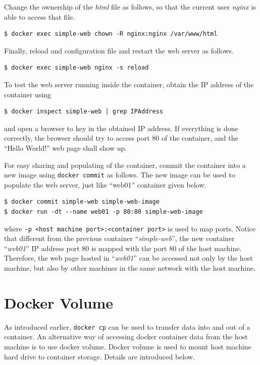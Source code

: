 Change the ownership of the \textit{html} file as follows, so that the current user \textit{nginx} is able to access that file.
\begin{lstlisting}
$ docker exec simple-web chown -R nginx:nginx /var/www/html
\end{lstlisting}

Finally, reload and configuration file and restart the web server as follows.
\begin{lstlisting}
$ docker exec simple-web nginx -s reload
\end{lstlisting}

To test the web server running inside the container, obtain the IP address of the container using
\begin{lstlisting}
$ docker inspect simple-web | grep IPAddress
\end{lstlisting}
and open a browser to key in the obtained IP address. If everything is done correctly, the browser should try to access port 80 of the container, and the ``Hello World!'' web page shall show up.

For easy sharing and populating of the container, commit the container into a new image using \verb|docker commit| as follows. The new image can be used to populate the web server, just like ``web01'' container given below.
\begin{lstlisting}
$ docker commit simple-web simple-web-image
$ docker run -dt --name web01 -p 80:80 simple-web-image
\end{lstlisting}
where \verb|-p <host machine port>:<container port>| is used to map ports. Notice that different from the previous container ``\textit{simple-web}'', the new container ``\textit{web01}'' IP address port 80 is mapped with the port 80 of the host machine. Therefore, the web page hosted in ``\textit{web01}'' can be accessed not only by the host machine, but also by other machines in the same network with the host machine.

\section{Docker Volume} \label{ch:vac:subsec:dockervolume}

As introduced earlier, \verb|docker cp| can be used to transfer data into and out of a container. An alternative way of accessing docker container data from the host machine is to use docker volume. Docker volume is used to mount host machine hard drive to container storage. Details are introduced below.

